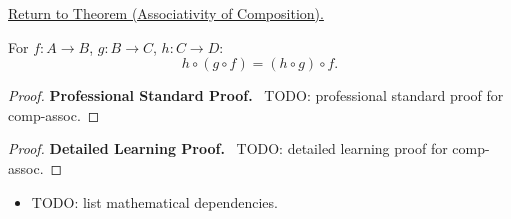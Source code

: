 \newpage
{}
\label{prf:comp-assoc}

\begin{remark*}[Return]
\hyperref[thm:comp-assoc]{Return to Theorem (Associativity of Composition).}
\end{remark*}

\begin{theorem*}
For $f : A \to B$, $g : B \to C$, $h : C \to D$:
\[
h \circ (g \circ f) = (h \circ g) \circ f.
\]
\end{theorem*}

\begin{proof}
\textbf{Professional Standard Proof.}~
TODO: professional standard proof for comp-assoc.
\end{proof}

\begin{proof}
\textbf{Detailed Learning Proof.}~
TODO: detailed learning proof for comp-assoc.
\end{proof}

\begin{remark*}
\end{remark*}

\begin{dependencies}
\begin{itemize}
  \item TODO: list mathematical dependencies.
\end{itemize}
\end{dependencies}

\clearpage
